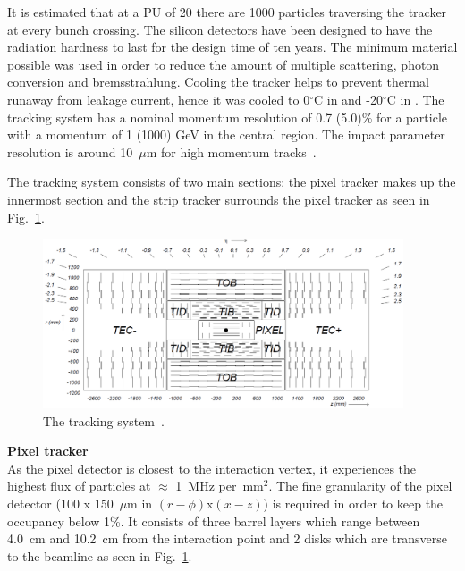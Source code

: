 It is estimated that at a PU of 20 there are 1000 particles traversing the tracker at every bunch crossing. The silicon detectors have been designed to have the radiation hardness to last for the design time of ten years. The minimum material possible was used in order to reduce the amount of multiple scattering, photon conversion and bremsstrahlung.
Cooling the tracker helps to prevent thermal runaway from leakage current, hence it was cooled to 0$^{\circ}$C in \runone and -20$^{\circ}$C in \runtwo. 
The tracking system has a nominal momentum resolution of 0.7 (5.0)\% for a particle with a momentum of 1 (1000) GeV in the central region. The impact parameter resolution is around 10~$\mu$m for high momentum tracks~\cite{Khachatryan2010}.



The tracking system consists of two main sections: the pixel tracker makes up the innermost section and the strip tracker surrounds the pixel tracker as seen in Fig.~\ref{fig:TrackerWhole}. 

\begin{figure}[ht!]
\centering
    \includegraphics[width=0.95\textwidth]{images/TrackerWhole.png}
    \caption{The tracking system~\cite{1748-0221-3-08-S08004}.}
    \label{fig:TrackerWhole}
\end{figure}

\textbf{Pixel tracker}\\
As the pixel detector is closest to the interaction vertex, it experiences the highest flux of particles at $\approx$ 1~MHz per~mm$^{2}$. The fine granularity of the pixel detector (100 x 150~$\mu$m in $(r-\phi)$x$(x-z)$) is required in order to keep the occupancy below 1\%. It consists of three barrel layers which range between 4.0~cm and 10.2~cm from the interaction point and 2 disks which are transverse to the beamline as seen in Fig.~\ref{fig:TrackerWhole}.\\

